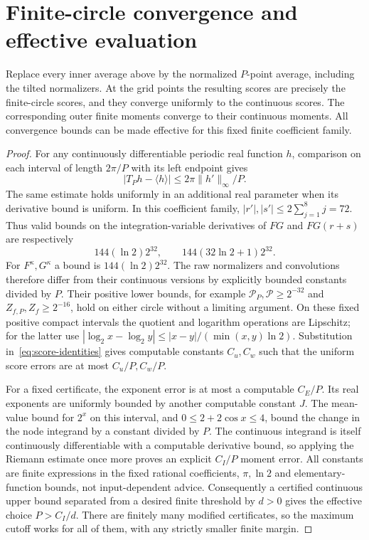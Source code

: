 \section{Finite-circle convergence and effective evaluation}\label{sec:finite}
\begin{proposition}\label{prop:finite}
Replace every inner average above by the normalized $P$-point average,
including the tilted normalizers. At the grid points the resulting
scores are precisely the finite-circle scores, and they converge
uniformly to the continuous scores. The corresponding outer finite
moments converge to their continuous moments. All convergence bounds
can be made effective for this fixed finite coefficient family.
\end{proposition}
\begin{proof}
For any continuously differentiable periodic real function $h$, comparison
on each interval of length $2\pi/P$ with its left endpoint gives
\[
 |T_Ph-\langle h\rangle|\le 2\pi\|h'\|_\infty/P.
\]
The same estimate holds uniformly in an additional real parameter
when its derivative bound is uniform. In this coefficient family,
$|r'|,|s'|\le2\sum_{j=1}^8j=72$. Thus valid bounds on the
integration-variable derivatives of $FG$ and $FG(r+s)$ are respectively
\[
 144(\ln2)2^{32},\qquad 144(32\ln2+1)2^{32}.
\]
For $F^\kappa,G^\kappa$ a bound is $144(\ln2)2^{32}$.
The raw normalizers and convolutions therefore differ from their
continuous versions by explicitly bounded constants divided by $P$.
Their positive lower bounds, for example $\mathcal P_P,\mathcal P\ge2^{-32}$
and $Z_{f,P},Z_f\ge2^{-16}$, hold on either circle without a limiting
argument. On these fixed positive compact intervals the quotient and
logarithm operations are Lipschitz; for the latter use
$|\log_2x-\log_2y|\le |x-y|/(\min(x,y)\ln2)$.
Substitution in~\eqref{eq:score-identities} gives computable constants
$C_u,C_w$ such that the uniform score errors are at most $C_u/P,C_w/P$.

For a fixed certificate, the exponent error is at most a computable
$C_E/P$. Its real exponents are uniformly bounded by another computable
constant $J$. The mean-value bound for $2^x$ on this interval, and
$0\le2+2\cos x\le4$, bound the change in the node integrand by a
constant divided by $P$. The continuous integrand is itself continuously
differentiable with a computable derivative bound, so applying the
Riemann estimate once more proves an explicit $C_I/P$ moment error.
All constants are finite expressions in the fixed rational coefficients,
$\pi,\ln2$ and elementary-function bounds, not input-dependent advice.
Consequently a certified continuous upper bound separated from a desired
finite threshold by $d>0$ gives the effective choice $P>C_I/d$.
There are finitely many modified certificates, so the maximum cutoff
works for all of them, with any strictly smaller finite margin.


\end{proof}

